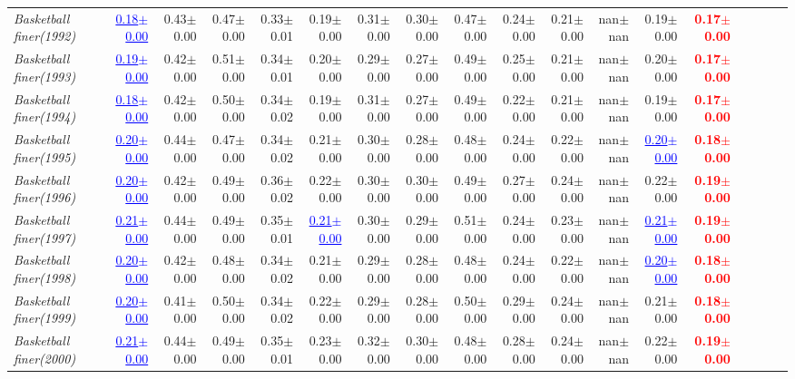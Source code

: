 \documentclass[nohyperref]{article}
\theoremstyle{plain}
\theoremstyle{definition}
\theoremstyle{remark}
\newcommand{\red}[1]{\textcolor{red}{\textbf{#1}}}
\newcommand{\blue}[1]{\textcolor{blue}{\underline{#1}}}
\begin{document}
\begin{table*}[!ht]
{\begin{tabular}{lrrrrrrrrrrrrrrrrr}
			{\it Basketball finer(1992)} & \blue{0.18$\pm$0.00} & 0.43$\pm$0.00 & 0.47$\pm$0.00 & 0.33$\pm$0.01 & 0.19$\pm$0.00 & 0.31$\pm$0.00 & 0.30$\pm$0.00 & 0.47$\pm$0.00 & 0.24$\pm$0.00 & 0.21$\pm$0.00 & nan$\pm$nan & 0.19$\pm$0.00 & \red{0.17$\pm$0.00} \\
			{\it Basketball finer(1993)} & \blue{0.19$\pm$0.00} & 0.42$\pm$0.00 & 0.51$\pm$0.00 & 0.34$\pm$0.01 & 0.20$\pm$0.00 & 0.29$\pm$0.00 & 0.27$\pm$0.00 & 0.49$\pm$0.00 & 0.25$\pm$0.00 & 0.21$\pm$0.00 & nan$\pm$nan & 0.20$\pm$0.00 & \red{0.17$\pm$0.00} \\
			{\it Basketball finer(1994)} & \blue{0.18$\pm$0.00} & 0.42$\pm$0.00 & 0.50$\pm$0.00 & 0.34$\pm$0.02 & 0.19$\pm$0.00 & 0.31$\pm$0.00 & 0.27$\pm$0.00 & 0.49$\pm$0.00 & 0.22$\pm$0.00 & 0.21$\pm$0.00 & nan$\pm$nan & 0.19$\pm$0.00 & \red{0.17$\pm$0.00} \\
			{\it Basketball finer(1995)} & \blue{0.20$\pm$0.00} & 0.44$\pm$0.00 & 0.47$\pm$0.00 & 0.34$\pm$0.02 & 0.21$\pm$0.00 & 0.30$\pm$0.00 & 0.28$\pm$0.00 & 0.48$\pm$0.00 & 0.24$\pm$0.00 & 0.22$\pm$0.00 & nan$\pm$nan & \blue{0.20$\pm$0.00} & \red{0.18$\pm$0.00} \\
			{\it Basketball finer(1996)} & \blue{0.20$\pm$0.00} & 0.42$\pm$0.00 & 0.49$\pm$0.00 & 0.36$\pm$0.02 & 0.22$\pm$0.00 & 0.30$\pm$0.00 & 0.30$\pm$0.00 & 0.49$\pm$0.00 & 0.27$\pm$0.00 & 0.24$\pm$0.00 & nan$\pm$nan & 0.22$\pm$0.00 & \red{0.19$\pm$0.00} \\
			{\it Basketball finer(1997)} & \blue{0.21$\pm$0.00} & 0.44$\pm$0.00 & 0.49$\pm$0.00 & 0.35$\pm$0.01 & \blue{0.21$\pm$0.00} & 0.30$\pm$0.00 & 0.29$\pm$0.00 & 0.51$\pm$0.00 & 0.24$\pm$0.00 & 0.23$\pm$0.00 & nan$\pm$nan & \blue{0.21$\pm$0.00} & \red{0.19$\pm$0.00} \\
			{\it Basketball finer(1998)} & \blue{0.20$\pm$0.00} & 0.42$\pm$0.00 & 0.48$\pm$0.00 & 0.34$\pm$0.02 & 0.21$\pm$0.00 & 0.29$\pm$0.00 & 0.28$\pm$0.00 & 0.48$\pm$0.00 & 0.24$\pm$0.00 & 0.22$\pm$0.00 & nan$\pm$nan & \blue{0.20$\pm$0.00} & \red{0.18$\pm$0.00} \\
			{\it Basketball finer(1999)} & \blue{0.20$\pm$0.00} & 0.41$\pm$0.00 & 0.50$\pm$0.00 & 0.34$\pm$0.02 & 0.22$\pm$0.00 & 0.29$\pm$0.00 & 0.28$\pm$0.00 & 0.50$\pm$0.00 & 0.29$\pm$0.00 & 0.24$\pm$0.00 & nan$\pm$nan & 0.21$\pm$0.00 & \red{0.18$\pm$0.00} \\
			{\it Basketball finer(2000)} & \blue{0.21$\pm$0.00} & 0.44$\pm$0.00 & 0.49$\pm$0.00 & 0.35$\pm$0.01 & 0.23$\pm$0.00 & 0.32$\pm$0.00 & 0.30$\pm$0.00 & 0.48$\pm$0.00 & 0.28$\pm$0.00 & 0.24$\pm$0.00 & nan$\pm$nan & 0.22$\pm$0.00 & \red{0.19$\pm$0.00} \\

\end{tabular}}
\end{table*}
\end{document}
